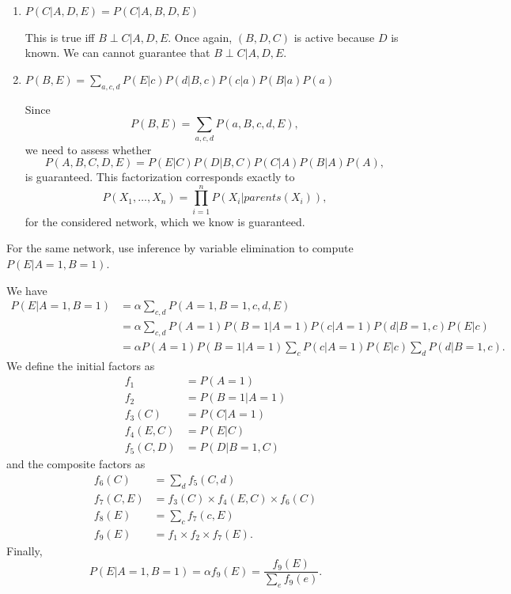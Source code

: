 \documentclass[11pt, a4paper]{article}
\begin{document}
\begin{enumerate}
    \item $P(C | A, D, E) = P(C | A, B, D, E)$

    \begin{solution}
        This is true iff $B \perp C | A, D, E$. Once again, $(B, D, C)$ is active because $D$ is known. We can cannot guarantee that $B \perp C | A, D, E$.
    \end{solution}

    \item $P(B, E) = \sum_{a, c, d} P(E | c) P(d | B, c) P(c | a) P(B | a) P(a)$

    \begin{solution}
        Since $$P(B, E) = \sum_{a, c, d} P(a, B, c, d, E),$$ we need to assess whether $$P(A, B, C, D, E) = P(E | C) P(D | B, C) P(C | A) P(B | A) P(A),$$
        is guaranteed. This factorization corresponds exactly to
        \begin{equation*}
            P(X_1, \dots, X_n) = \prod_{i = 1}^n P(X_i | parents(X_i)) ,
        \end{equation*}
        for the considered network, which we know is guaranteed.
    \end{solution}
\end{enumerate}

For the same network, use inference by variable elimination to compute $P(E | A = 1, B = 1)$.

\begin{solution}
    We have
    \begin{align*}
        P(E | A = 1, B = 1) & = \alpha \sum_{c, d} P(A = 1, B = 1, c, d, E)\\
        & = \alpha \sum_{c, d} P(A = 1) P(B = 1| A = 1) P(c| A = 1) P(d|B = 1, c) P(E|c) \\
        & = \alpha P(A = 1) P(B = 1 | A = 1) \sum_{c} P(c|A = 1) P(E|c)\sum_d P(d|B = 1,c) .
    \end{align*}
    We define the initial factors as
    \begin{align*}
        f_1 & = P(A=1) \\
        f_2 & = P(B=1 | A=1) \\
        f_3(C) & = P(C|A=1) \\
        f_4(E, C) & = P(E|C) \\
        f_5(C, D) & = P(D|B=1, C)
    \end{align*}
    and the composite factors as
    \begin{align*}
        f_6(C) & = \sum_d f_5(C, d) \\
        f_7(C, E) & = f_3(C) \times f_4(E, C) \times f_6(C) \\
        f_8(E) & = \sum_c f_7(c, E) \\
        f_9(E) & = f_1 \times f_2 \times f_7(E) .
    \end{align*}
    Finally,
    \begin{equation*}
        P(E | A = 1, B = 1) = \alpha f_9(E) = \frac{f_9(E)}{\sum_e f_9(e)}.
    \end{equation*}
\end{solution}
\end{document}
